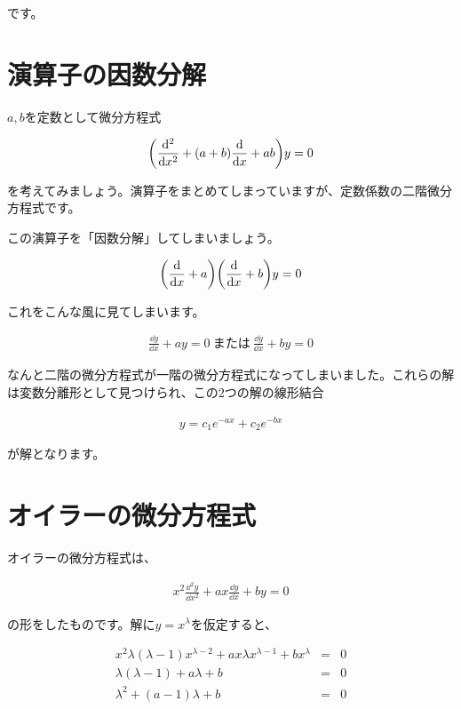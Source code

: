 \noindent
です。








\section{演算子の因数分解}
\label{factorization}
$a,b$を定数として微分方程式

\begin{eqnarray}
    \pqty{\frac{\dd^2}{\dd x^2}+(a+b)\frac{\dd}{\dd x}+ab}y=0
\end{eqnarray}

\noindent
を考えてみましょう。演算子をまとめてしまっていますが、定数係数の二階微分方程式です。

この演算子を「因数分解」してしまいましょう。

\begin{eqnarray}
    \pqty{\frac{\dd}{\dd x}+a}\pqty{\frac{\dd}{\dd x}+b}y=0
\end{eqnarray}

これをこんな風に見てしまいます。

\begin{eqnarray}
    \frac{\dd y}{\dd x}+ay=0\ \mbox{または}\ \frac{\dd y}{\dd x}+by=0
\end{eqnarray}

なんと二階の微分方程式が一階の微分方程式になってしまいました。これらの解は変数分離形として見つけられ、この2つの解の線形結合

\begin{eqnarray}
    y=c_1e^{-ax}+c_2e^{-bx}
\end{eqnarray}

\noindent
が解となります。









\section{オイラーの微分方程式}
\label{euler}
オイラーの微分方程式は、

\begin{eqnarray}
    x^2\frac{\dd^2 y}{\dd x^2}+ax\frac{\dd y}{\dd x}+by=0
    \label{eq:euler}
\end{eqnarray}

\noindent
の形をしたものです。解に$y=x^\lambda$を仮定すると、

\begin{eqnarray}
    x^2\lambda(\lambda-1)x^{\lambda-2}+ax\lambda x^{\lambda-1}+bx^\lambda&=&0 \\
    \lambda(\lambda-1)+a\lambda+b&=&0 \nonumber \\
    \lambda^2+(a-1)\lambda+b&=&0
    \label{eq:euler-characteristic}
\end{eqnarray}

